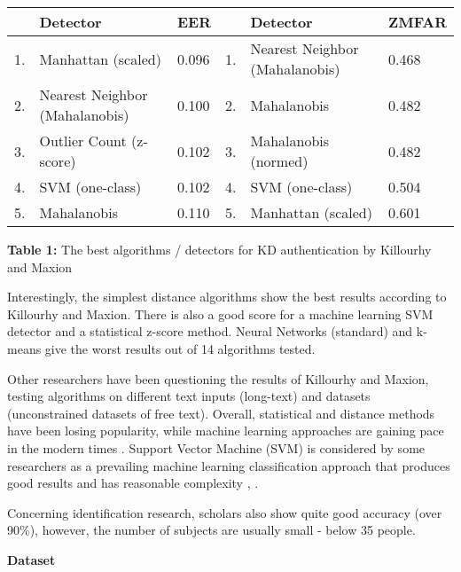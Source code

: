 \documentclass[12pt,a4]{article}
\begin{document}
\begin{center}

\begin{tabular*}{\textwidth}{l @{\extracolsep{\fill}} lllll}

\hline
 & \textbf{Detector} & \textbf{EER} & & \textbf{Detector} & \textbf{ZMFAR} \\
 \hline
1. & Manhattan (scaled) & 0.096 & 1. & Nearest Neighbor (Mahalanobis) & 0.468 \\ 
\hline
2. & Nearest Neighbor (Mahalanobis) & 0.100 & 2. & Mahalanobis & 0.482 \\ 
\hline
3. & Outlier Count (z-score) & 0.102 & 3. & Mahalanobis (normed) & 0.482 \\

\hline
4. & SVM (one-class) & 0.102 & 4. & SVM (one-class) & 0.504 \\
\hline
5. & Mahalanobis & 0.110 & 5. & Manhattan (scaled) & 0.601 \\
\hline
\end{tabular*}
\textbf{Table 1:} The best algorithms / detectors for KD authentication by Killourhy and Maxion
\end{center}

Interestingly, the simplest distance algorithms show the best results according to Killourhy and Maxion. There is also a good score for a machine learning SVM detector and a statistical z-score method. Neural Networks (standard) and k-means give the worst results out of 14 algorithms tested.

Other researchers have been questioning the results of Killourhy and Maxion, testing algorithms on different text inputs (long-text) and datasets (unconstrained datasets of free text). Overall, statistical and distance methods have been losing popularity, while machine learning approaches are gaining pace in the modern times \cite{Liakat:2017}. Support Vector Machine (SVM) is  considered by some researchers as a prevailing machine learning classification approach that produces good results and has reasonable complexity \cite{Liakat:2017}, \cite{raul2020comprehensive}.

Concerning identification research, scholars also show quite good accuracy (over 90\%)\cite{banerjee2012biometric}, however, the number of subjects are usually small - below 35 people. 

\bigskip
\large\textbf{Dataset}
\bigskip
\end{document}
